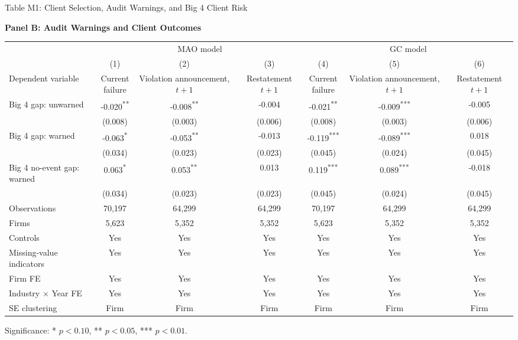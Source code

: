 \documentclass[10pt]{article}
\newcommand{\sym}[1]{\textsuperscript{#1}}
\begin{document}
\begin{minipage}{19cm}\fontsize{10}{12}\selectfont\setlength{\tabcolsep}{4pt}\renewcommand{\arraystretch}{1.15}

\begin{center} Table M1: Client Selection, Audit Warnings, and Big 4 Client Risk\end{center}
\noindent\textbf{Panel B: Audit Warnings and Client Outcomes}\par\medskip
\begin{center}\begin{tabular*}{\textwidth}{@{\extracolsep{\fill}}lcccccc@{}}
\toprule
 & \multicolumn{3}{c}{MAO model} & \multicolumn{3}{c}{GC model} \\
\cmidrule(lr){2-4}\cmidrule(lr){5-7}
 & (1) & (2) & (3) & (4) & (5) & (6) \\
Dependent variable & \shortstack{Current\\failure} & \shortstack{Violation\\announcement, $t+1$} & \shortstack{Restatement\\$t+1$} & \shortstack{Current\\failure} & \shortstack{Violation\\announcement, $t+1$} & \shortstack{Restatement\\$t+1$} \\
\midrule
Big 4 gap: unwarned & -0.020\sym{**} & -0.008\sym{**} & -0.004 & -0.021\sym{**} & -0.009\sym{***} & -0.005 \\
 & (0.008) & (0.003) & (0.006) & (0.008) & (0.003) & (0.006) \\
Big 4 gap: warned & -0.063\sym{*} & -0.053\sym{**} & -0.013 & -0.119\sym{***} & -0.089\sym{***} & 0.018 \\
 & (0.034) & (0.023) & (0.023) & (0.045) & (0.024) & (0.045) \\
Big 4 no-event gap: warned & 0.063\sym{*} & 0.053\sym{**} & 0.013 & 0.119\sym{***} & 0.089\sym{***} & -0.018 \\
 & (0.034) & (0.023) & (0.023) & (0.045) & (0.024) & (0.045) \\
\midrule
Observations & 70,197 & 64,299 & 64,299 & 70,197 & 64,299 & 64,299 \\
Firms & 5,623 & 5,352 & 5,352 & 5,623 & 5,352 & 5,352 \\
Controls & Yes & Yes & Yes & Yes & Yes & Yes \\
Missing-value indicators & Yes & Yes & Yes & Yes & Yes & Yes \\
Firm FE & Yes & Yes & Yes & Yes & Yes & Yes \\
Industry $\times$ Year FE & Yes & Yes & Yes & Yes & Yes & Yes \\
SE clustering & Firm & Firm & Firm & Firm & Firm & Firm \\
\bottomrule\end{tabular*}\end{center}

\par\smallskip\raggedright\fontsize{9}{11}\selectfont Significance: * $p<0.10$, ** $p<0.05$, *** $p<0.01$.
\end{minipage}
\end{document}
